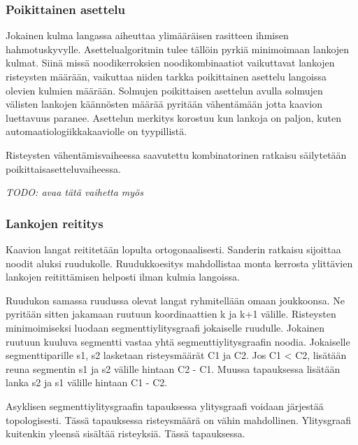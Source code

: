\documentclass[finnish,12pt]{article}
\begin{document}

		\subsubsection{Poikittainen asettelu}

Jokainen kulma langassa aiheuttaa ylimääräisen rasitteen ihmisen hahmotuskyvylle. \cite{RefWorks:47}
Asettelualgoritmin tulee tällöin pyrkiä minimoimaan lankojen kulmat.
Siinä missä noodikerroksien noodikombinaatiot vaikuttavat lankojen risteysten määrään, vaikuttaa niiden tarkka poikittainen asettelu langoissa olevien kulmien määrään.
Solmujen poikittaisen asettelun avulla solmujen välisten lankojen käännösten määrää pyritään vähentämään jotta kaavion luettavuus paranee.
Asettelun merkitys korostuu kun lankoja on paljon, kuten automaatiologiikkakaaviolle on tyypillistä.

Risteysten vähentämisvaiheessa saavutettu kombinatorinen ratkaisu säilytetään poikittaisasetteluvaiheessa.

\emph{TODO: avaa tätä vaihetta myös}

		\subsubsection{Lankojen reititys}


Kaavion langat reititetään lopulta ortogonaalisesti.
Sanderin ratkaisu sijoittaa noodit aluksi ruudukolle.
Ruudukkoesitys mahdollistaa monta kerrosta ylittävien lankojen reitittämisen helposti ilman kulmia langoissa.

Ruudukon samassa ruudussa olevat langat ryhmitellään omaan joukkoonsa.
Ne pyritään sitten jakamaan ruutuun koordinaattien k ja k+1 välille.
Risteysten minimoimiseksi luodaan segmenttiylitysgraafi jokaiselle ruudulle. Jokainen ruutuun kuuluva segmentti vastaa yhtä segmenttiylitysgraafin noodia. Jokaiselle segmenttiparille s1, s2 lasketaan risteysmäärät C1 ja C2. Jos C1 < C2, lisätään reuna segmentin s1 ja s2 välille hintaan C2 - C1. Muussa tapauksessa lisätään lanka s2 ja s1 välille hintaan C1 - C2.

Asyklisen segmenttiylitysgraafin tapauksessa ylitysgraafi voidaan järjestää topologisesti. Tässä tapauksessa risteysmäärä on vähin mahdollinen. Ylitysgraafi kuitenkin yleensä sisältää risteyksiä. Tässä tapauksessa.\cite{RefWorks:17}
\end{document}

